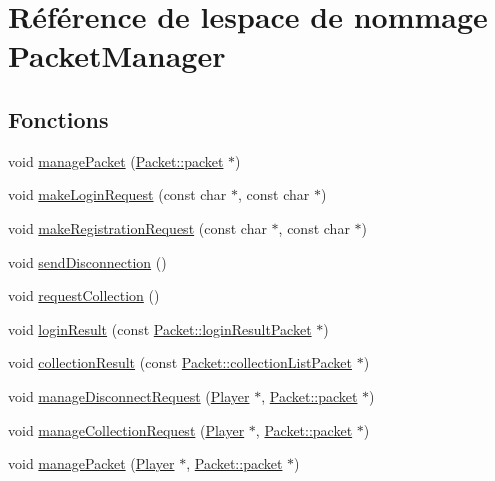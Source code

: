 \hypertarget{namespacePacketManager}{}\section{Référence de l\textquotesingle{}espace de nommage Packet\+Manager}
\label{namespacePacketManager}
\subsection*{Fonctions}
\begin{DoxyCompactItemize}
\item 
void \hyperlink{namespacePacketManager_ac206635e6603c3488fb11d04cc0fa3e9}{manage\+Packet} (\hyperlink{structPacket_1_1packet}{Packet\+::packet} $\ast$)
\item 
void \hyperlink{namespacePacketManager_a059f1572687e336c45e1cc73e069fe4f}{make\+Login\+Request} (const char $\ast$, const char $\ast$)
\item 
void \hyperlink{namespacePacketManager_adacf7794a085944d9bb34af27332605d}{make\+Registration\+Request} (const char $\ast$, const char $\ast$)
\item 
void \hyperlink{namespacePacketManager_a62456ed8f85eb40c84ec97b49f6fceff}{send\+Disconnection} ()
\item 
void \hyperlink{namespacePacketManager_afd974f2f63642ce840652d320886951c}{request\+Collection} ()
\item 
void \hyperlink{namespacePacketManager_a255a83fde064b3b6bbc192dc49ba30a4}{login\+Result} (const \hyperlink{structPacket_1_1loginResultPacket}{Packet\+::login\+Result\+Packet} $\ast$)
\item 
void \hyperlink{namespacePacketManager_a2520b5ad3390ebf5727db3759769db47}{collection\+Result} (const \hyperlink{structPacket_1_1collectionListPacket}{Packet\+::collection\+List\+Packet} $\ast$)
\item 
void \hyperlink{namespacePacketManager_abd99694448081508766a221b786b204d}{manage\+Disconnect\+Request} (\hyperlink{classPlayer}{Player} $\ast$, \hyperlink{structPacket_1_1packet}{Packet\+::packet} $\ast$)
\item 
void \hyperlink{namespacePacketManager_a29507cd1def594e5607032ea8865545c}{manage\+Collection\+Request} (\hyperlink{classPlayer}{Player} $\ast$, \hyperlink{structPacket_1_1packet}{Packet\+::packet} $\ast$)
\item 
void \hyperlink{namespacePacketManager_a643568c924bb5515554cc87c0baebc74}{manage\+Packet} (\hyperlink{classPlayer}{Player} $\ast$, \hyperlink{structPacket_1_1packet}{Packet\+::packet} $\ast$)

\end{DoxyCompactItemize}
